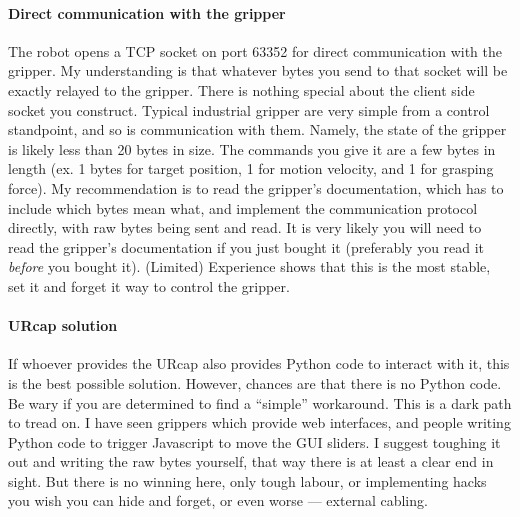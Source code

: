 \paragraph{Direct communication with the gripper}
The robot opens a TCP socket on port 63352 for direct communication with the gripper.
My understanding is that whatever bytes you send to that socket
will be exactly relayed to the gripper.
There is nothing special about the client side socket you construct.
Typical industrial gripper are very simple from a control standpoint,
and so is communication with them. Namely, the state of the gripper
is likely less than 20 bytes in size. The commands you give it are a few bytes
in length (ex. 1 bytes for target position, 1 for motion velocity, and 1 for grasping force).
My recommendation is to read the gripper's documentation, which has to include
which bytes mean what, and implement the communication protocol directly,
with raw bytes being sent and read. It is very likely you will need to read the gripper's
documentation if you just bought it (preferably you read it \textit{before} you bought it).
(Limited) Experience shows that this is the most stable, set it and forget it way to control the gripper.

\paragraph{URcap solution}
If whoever provides the URcap also provides Python code to interact with it,
this is the best possible solution.
However, chances are that there is no Python code. Be wary if you are determined
to find a ``simple'' workaround. This is a dark path to tread on.
I have seen grippers which provide web interfaces, and people writing Python code
to trigger Javascript to move the GUI sliders.
I suggest toughing it out and writing the raw bytes yourself, that way there is 
at least a clear end in sight. But there is no winning here, only tough labour, or
implementing hacks you wish you can hide and forget, or even worse --- external cabling.

